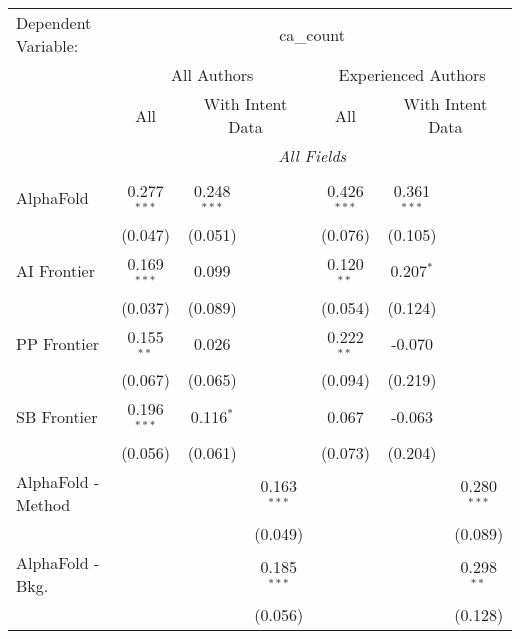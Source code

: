 \begingroup
\centering
\begin{tabular}{lcccccc}
   \tabularnewline \midrule \midrule
   Dependent Variable: & \multicolumn{6}{c}{ca\_count}\\
 & \multicolumn{3}{c}{All Authors} & \multicolumn{3}{c}{Experienced Authors} \\
\cmidrule(lr){2-4} \cmidrule(lr){5-7}
 & \multicolumn{1}{c}{All} & \multicolumn{2}{c}{With Intent Data} & \multicolumn{1}{c}{All} & \multicolumn{2}{c}{With Intent Data} \\
\cmidrule(lr){2-2} \cmidrule(lr){3-4} \cmidrule(lr){5-5} \cmidrule(lr){6-7}
 & \multicolumn{6}{c}{\textit{All Fields}} \\ \\
   AlphaFold                     & 0.277$^{***}$ & 0.248$^{***}$ &                & 0.426$^{***}$ & 0.361$^{***}$ &   \\   
                                 & (0.047)       & (0.051)       &                & (0.076)       & (0.105)       &   \\   
   AI Frontier                   & 0.169$^{***}$ & 0.099         &                & 0.120$^{**}$  & 0.207$^{*}$   &   \\   
                                 & (0.037)       & (0.089)       &                & (0.054)       & (0.124)       &   \\   
   PP Frontier                   & 0.155$^{**}$  & 0.026         &                & 0.222$^{**}$  & -0.070        &   \\   
                                 & (0.067)       & (0.065)       &                & (0.094)       & (0.219)       &   \\   
   SB Frontier                   & 0.196$^{***}$ & 0.116$^{*}$   &                & 0.067         & -0.063        &   \\   
                                 & (0.056)       & (0.061)       &                & (0.073)       & (0.204)       &   \\   
   AlphaFold - Method            &               &               & 0.163$^{***}$  &               &               & 0.280$^{***}$\\   
                                 &               &               & (0.049)        &               &               & (0.089)\\   
   AlphaFold - Bkg.              &               &               & 0.185$^{***}$  &               &               & 0.298$^{**}$\\   
                                 &               &               & (0.056)        &               &               & (0.128)\\   

\end{tabular}
